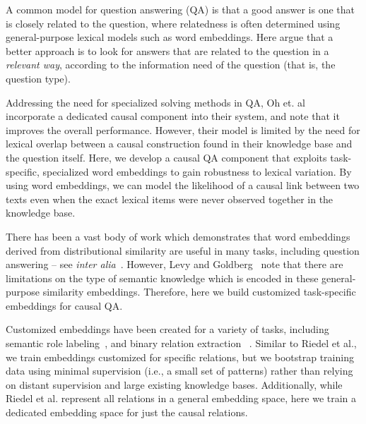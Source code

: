 
A common model for question answering (QA) is that a good answer is one that is closely related to the question, where relatedness is often determined using general-purpose lexical models such as word embeddings. 
Here argue that a better approach is to look for answers that are related to the question in a {\em relevant way}, according to the information need of the question (that is, the question type).

Addressing the need for specialized solving methods in QA, Oh et. al~\citeyear{oh2013question} incorporate a dedicated causal component into their system, and note that it improves the overall performance.  However, their model is limited by the need for lexical overlap between a causal construction found in their knowledge base and the question itself.  Here, we develop a causal QA component that exploits task-specific, specialized word embeddings to gain robustness to lexical variation.  
By using word embeddings, we can model the likelihood of a causal link between two texts even when the exact lexical items were never observed together in the knowledge base.

There has been a vast body of work which demonstrates that word embeddings derived from distributional similarity are useful in many tasks, including question answering -- see \emph{inter alia}~\mbox{\cite{fried2015higher,yih13}}.  However, Levy and Goldberg~\citeyear{levy2015supervised} note that there are limitations on the type of semantic knowledge which is encoded in these general-purpose similarity embeddings.  Therefore, here we build customized task-specific embeddings for causal QA.

Customized embeddings have been created for a variety of tasks, including semantic role labeling~\cite{fitzgerald2015semantic,woodsenddistributed}, and binary relation extraction ~\mbox{\cite{riedel2013relation}.}
Similar to Riedel et al., we train embeddings customized for specific relations, but we bootstrap training data using minimal supervision (i.e., a small set of patterns) rather than relying on distant supervision and large existing knowledge bases.  Additionally, while Riedel et al. represent all relations in a general embedding space, here we train a dedicated embedding space for just the causal relations. 

